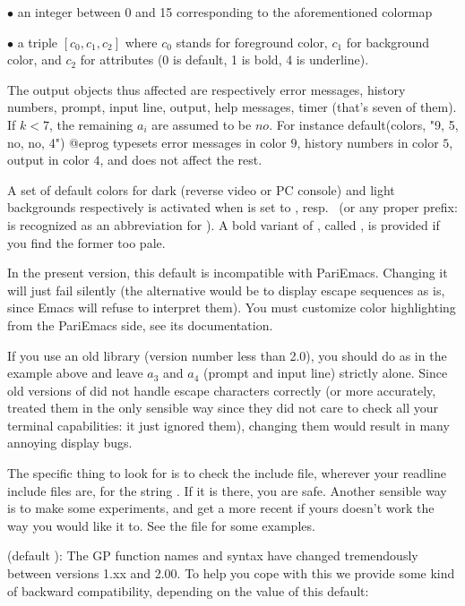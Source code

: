 \noindent $\bullet$ an integer between 0 and 15 corresponding to the
aforementioned colormap

\noindent $\bullet$ a triple $[c_0,c_1,c_2]$ where $c_0$ stands for foreground
color, $c_1$ for background color, and $c_2$ for attributes (0 is default, 1
is bold, 4 is underline).

The output objects thus affected are respectively error messages,
history numbers, prompt, input line, output, help messages, timer (that's
seven of them). If $k < 7$, the remaining $a_i$ are assumed to be $no$. For
instance
%
\bprog
default(colors, "9, 5, no, no, 4")
@eprog
\noindent
typesets error messages in color $9$, history numbers in color $5$, output in
color $4$, and does not affect the rest.

A set of default colors for dark (reverse video or PC console) and light
backgrounds respectively is activated when  is set to
, resp.~ (or any proper prefix:  is
recognized as an abbreviation for ). A bold variant of
, called , is provided if you find the former too
pale.

\emacs In the present version, this default is incompatible with PariEmacs.
Changing it will just fail silently (the alternative would be to display
escape sequences as is, since Emacs will refuse to interpret them).
You must customize color highlighting from the PariEmacs side, see its
documentation.

If you use an old  library (version number less than 2.0),
you should do as in the example above and leave $a_3$ and $a_4$ (prompt
and input line) strictly alone. Since old versions of  did
not handle escape characters correctly (or more accurately, treated them
in the only sensible way since they did not care to check all your terminal
capabilities: it just ignored them), changing them would result in many
annoying display bugs.

The specific thing to look for is to check the  include
file, wherever your readline include files are, for the string
. If it is there, you are safe. Another
sensible way is to make some experiments, and get a more recent
 if yours doesn't work the way you would like it to. See
the file  for some examples.

 (default ): The GP function names and syntax
have changed tremendously between versions 1.xx and 2.00. To help you cope
with this we provide some kind of backward compatibility, depending on the
value of this default:

